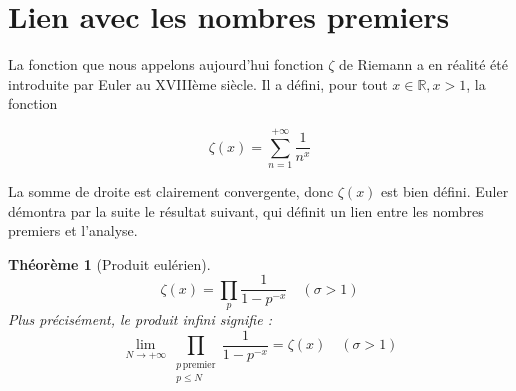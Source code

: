 \documentclass[french]{report}
\newtheorem{theorem}{Théorème}[section]
\begin{document}
\section{Lien avec les nombres premiers}

La fonction que nous appelons aujourd'hui fonction $\zeta$ de Riemann a en réalité été introduite par Euler au XVIIIème siècle. Il a défini, pour tout $x\in\mathbb{R}, x>1$, la fonction

\[ \zeta(x) = \sum_{n=1}^{+\infty}\frac{1}{n^x} \]

La somme de droite est clairement convergente, donc $\zeta(x)$ est bien défini. Euler démontra par la suite le résultat suivant, qui définit un lien entre les nombres premiers et l'analyse.

\begin{theorem}[Produit eulérien]\label{thm:produit-eulerien-reel}
  \[ \zeta(x) = \prod_p\frac{1}{1-p^{-x}}\quad(\sigma>1) \]
  Plus précisément, le produit infini signifie :
  \[ \lim_{N\to+\infty}\prod_{\substack{p\,\mathrm{premier}\\p\leq N}}\frac{1}{1-p^{-x}}=\zeta(x)\quad(\sigma>1) \]
\end{theorem}
\end{document}
